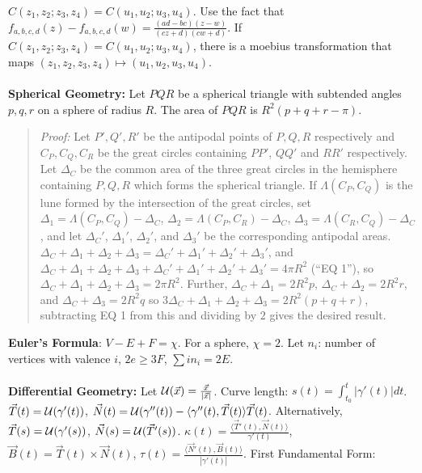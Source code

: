 $C(z_1, z_2; z_3, z_4) = C(u_1, u_2; u_3, u_4)$.
Use the fact that $f_{a,b,c,d}(z) - f_{a,b,c,d}(w) = {\frac {(ad-bc)(z-w)}{(cz+d)(cw+d)}}$.
If $C(z_1, z_2; z_3, z_4) = C(u_1, u_2; u_3, u_4)$, there is a moebius transformation that maps $(z_1, z_2, z_3, z_4) \mapsto (u_1, u_2, u_3, u_4)$.
\\
\\
{\bf Spherical Geometry:}  Let $PQR$ be a spherical triangle with subtended angles
$p, q, r$ on a sphere of radius $R$.  The area of $PQR$ is $R^2(p+q+r-\pi)$.
\begin{quote}
\emph{Proof:} Let $P', Q', R'$ be the antipodal points of $P, Q, R$ respectively and
$C_P, C_Q, C_R$ be the great circles containing $PP'$, $QQ'$ and $RR'$ respectively.
Let $\Delta_C$ be the common area of the three great circles in the hemisphere containing
$P, Q, R$ which forms the spherical triangle.  If $\Lambda(C_P, C_Q)$ 
is the lune formed by the intersection of the great circles, set 
$\Delta_1= \Lambda(C_P, C_Q) - \Delta_C$,
$\Delta_2= \Lambda(C_P, C_R) - \Delta_C$,
$\Delta_3= \Lambda(C_R, C_Q) - \Delta_C$, and let
$\Delta_C'$, $\Delta_1'$, $\Delta_2'$, and
$\Delta_3'$ be the corresponding antipodal areas.  
$\Delta_C+ \Delta_1+ \Delta_2+ \Delta_3= \Delta_C'+ \Delta_1'+ \Delta_2'+ \Delta_3'$,
and
$\Delta_C+ \Delta_1+ \Delta_2+ \Delta_3+\Delta_C'+ \Delta_1'+ \Delta_2'+ \Delta_3'
=4 \pi R^2$ (``EQ 1''), so
$\Delta_C+ \Delta_1+ \Delta_2+ \Delta_3= 2 \pi R^2$.  Further,
$\Delta_C + \Delta_1= 2 R^2 p$, $\Delta_C + \Delta_2= 2 R^2 r$, and
$\Delta_C + \Delta_3= 2 R^2 q$ so
$3\Delta_C+ \Delta_1+ \Delta_2+ \Delta_3 = 2 R^2 (p+q+r)$, 
subtracting EQ 1 from this and dividing by $2$ gives the desired result.
\end{quote}
{\bf Euler's Formula}: $V-E+F= \chi$. For a sphere, $\chi=2$.
Let $n_i$: number of vertices with valence $i$, $2e \geq 3F$, $\sum in_i = 2E$.
\\
\\
{\bf Differential Geometry:}
Let ${\cal U} ({\vec x}) = {\frac {\vec {x}} {|{\vec {x}}|}}$.  
Curve length: $s(t)= \int_{t_0}^t | \gamma'(t)| dt$.
${\vec T} (t)=  {\cal U} (\gamma'(t))$,
${\vec {N}}(t)= {\cal U} (\gamma''(t)) - \langle \gamma''(t), {\vec {T}}(t) \rangle {\vec T}(t)$.
Alternatively, ${\vec T}(s)= {\cal U}(\gamma'(s))$, 
${\vec N} (s)= {\cal U}({\vec T}'(s))$.
$\kappa(t)= {\frac {\langle {\vec {T}}'(t), {\vec {N}}(t) \rangle} {\gamma'(t)}}$, 
${\vec B}(t)= {\vec {T}}(t) \times {\vec {N}}(t)$,
$\tau(t)= {\frac {\langle {\vec {N}}'(t) , {\vec B}(t) \rangle} {|\gamma'(t)|}}$.
First Fundamental Form: 

